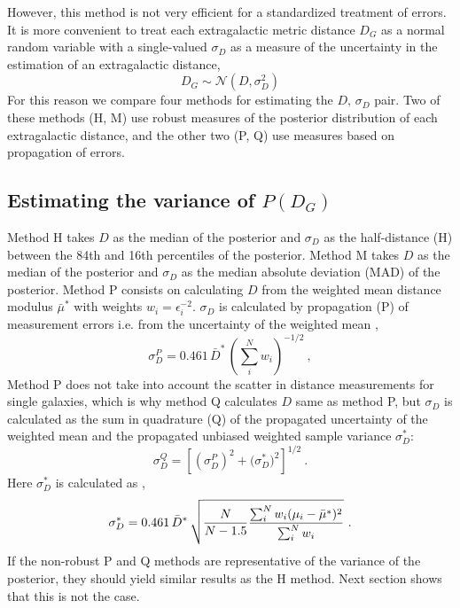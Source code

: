 \documentclass[a4paper,fleqn,usenatbib]{mnras}
\begin{document}
However, this method is not very efficient for a standardized treatment of errors. It is more convenient to treat each extragalactic metric distance $D_G$ as a normal random variable with a single-valued $\sigma_D$ as a measure of the uncertainty in the estimation of an extragalactic distance,
\[D_G\sim \mathcal{N}(D,\sigma_D^2)\]
For this reason we compare four methods for estimating the $D,\,\sigma_D$ pair. Two of these methods (H, M) use robust measures of the posterior distribution of each extragalactic distance, and the other two (P, Q) use measures based on propagation of errors.

\subsection{Estimating the variance of $P(D_G)$}
\label{sec:meth} 

Method H takes $D$ as the median of the posterior and $\sigma_D$ as the half-distance (H) between the 84th and 16th percentiles of the posterior. Method M takes $D$ as the median of the posterior and $\sigma_D$ as the median absolute deviation (MAD) of the posterior. Method P consists on calculating $D$ from the weighted mean distance modulus $\bar{\mu}^*$ with weights $w_i=\epsilon_i^{-2}$. $\sigma_D$ is calculated by propagation (P) of measurement errors  i.e. from the uncertainty of the weighted mean \citep{cosmicflows},
\begin{equation}
\sigma_D^P=0.461\,\bar{D}^*\,\left(\sum_i^Nw_i\right)^{-1/2} \ ,
\end{equation}
Method P does not take into account the scatter in distance measurements for single galaxies, which is why method Q calculates $D$ same as method P, but $\sigma_D$ is calculated as the sum in quadrature (Q) of the propagated uncertainty of the weighted mean and the propagated unbiased weighted sample variance $\sigma_D^*$:
\begin{equation}
\sigma_D^Q=\left[ \left(\sigma_D^P\right)^2+\Big(\sigma_D^*\Big)^2\right]^{1/2} \ .
\end{equation}
Here $\sigma^*_D$ is calculated as  \citep{wstdev},
\begin{equation}
\sigma^*_D=0.461\,\bar{D}^*\,\sqrt{\frac{N}{N-1.5}\frac{\sum_i^Nw_i(\mu_i-\bar{\mu}^*)^2}{\sum_i^Nw_i}\vphantom{\Biggl(}}\ .
\end{equation}
If the non-robust P and Q methods are representative of the variance of the posterior, they should yield similar results as the H method. Next section shows that this is not the case.
\end{document}
